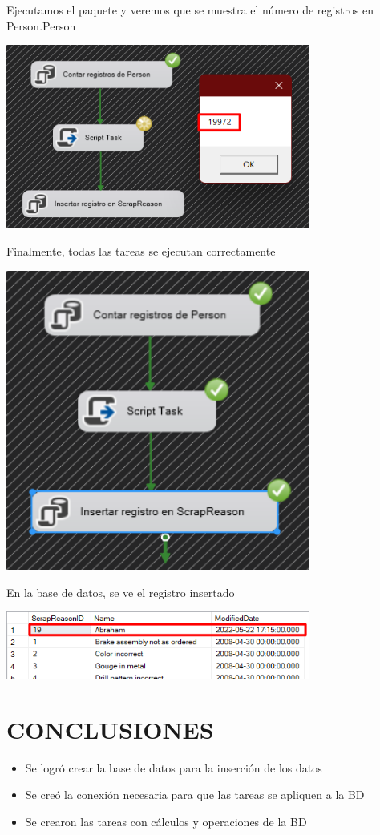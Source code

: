 \documentclass[12pt,letterpaper]{article}
\begin{document}
Ejecutamos el paquete y veremos que se muestra el número de registros en Person.Person

\begin{center}
    \includegraphics[width=10cm]{./img/img42.png}
\end{center}

Finalmente, todas las tareas se ejecutan correctamente

\begin{center}
    \includegraphics[width=10cm]{./img/img43.png}
\end{center}

En la base de datos, se ve el registro insertado

\begin{center}
    \includegraphics[width=10cm]{./img/img44.png}
\end{center}



\newpage
\section{CONCLUSIONES}
\begin{itemize}
    \item Se logró crear la base de datos para la inserción de los datos
    \item Se creó la conexión necesaria para que las tareas se apliquen a la BD
    \item Se crearon las tareas con cálculos y operaciones de la BD
\end{itemize}
\end{document}
